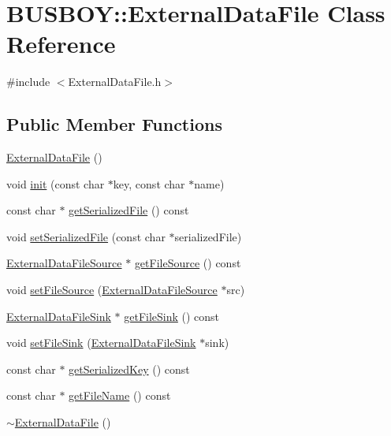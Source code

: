 \hypertarget{classBUSBOY_1_1ExternalDataFile}{
\section{BUSBOY::ExternalDataFile Class Reference}
\label{classBUSBOY_1_1ExternalDataFile}
}


{\ttfamily \#include $<$ExternalDataFile.h$>$}\subsection*{Public Member Functions}
\begin{DoxyCompactItemize}
\item 
\hyperlink{classBUSBOY_1_1ExternalDataFile_a00c0baea9f35c3073ef36ecf96286860}{ExternalDataFile} ()
\item 
void \hyperlink{classBUSBOY_1_1ExternalDataFile_a6a06510ed364868f84d68cbc31280143}{init} (const char $\ast$key, const char $\ast$name)
\item 
const char $\ast$ \hyperlink{classBUSBOY_1_1ExternalDataFile_ab6c68b49bee602513e89349482986b50}{getSerializedFile} () const 
\item 
void \hyperlink{classBUSBOY_1_1ExternalDataFile_abfc6794d41f9bbfaa93b4abee71a98e6}{setSerializedFile} (const char $\ast$serializedFile)
\item 
\hyperlink{classBUSBOY_1_1ExternalDataFileSource}{ExternalDataFileSource} $\ast$ \hyperlink{classBUSBOY_1_1ExternalDataFile_a1f4d152e6746e61a9ccfad2d0df23276}{getFileSource} () const 
\item 
void \hyperlink{classBUSBOY_1_1ExternalDataFile_a134d84d94fc581a282b43cc7531284d6}{setFileSource} (\hyperlink{classBUSBOY_1_1ExternalDataFileSource}{ExternalDataFileSource} $\ast$src)
\item 
\hyperlink{classBUSBOY_1_1ExternalDataFileSink}{ExternalDataFileSink} $\ast$ \hyperlink{classBUSBOY_1_1ExternalDataFile_acda0c4e130fb1effd902f3bc8a5820e0}{getFileSink} () const 
\item 
void \hyperlink{classBUSBOY_1_1ExternalDataFile_ab4f4f9709e435999a17d74774ebb898d}{setFileSink} (\hyperlink{classBUSBOY_1_1ExternalDataFileSink}{ExternalDataFileSink} $\ast$sink)
\item 
const char $\ast$ \hyperlink{classBUSBOY_1_1ExternalDataFile_a34f7faba7fc314c934b67f2276e39ee9}{getSerializedKey} () const 
\item 
const char $\ast$ \hyperlink{classBUSBOY_1_1ExternalDataFile_a0e40aff3e3ffa38a7b80d8bc2d812641}{getFileName} () const 
\item 
\hyperlink{classBUSBOY_1_1ExternalDataFile_a1bcddcd6f8acbcc75e1c9698651a3e54}{$\sim$ExternalDataFile} ()
\end{DoxyCompactItemize}


